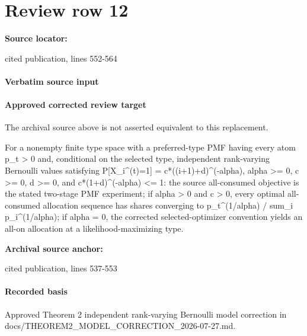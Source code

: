 \documentclass[10pt]{article}
\begin{document}
\section*{Review row 12}
\textbf{Source locator:} {\footnotesize\raggedright cited publication, lines 552-\allowbreak{}564\par}
\paragraph{Verbatim source input}
\begin{ReviewVerbatim}
\end{ReviewVerbatim}

\paragraph{Approved corrected review target}
The archival source above is not asserted equivalent to this replacement.
\begin{ReviewVerbatim}
For a nonempty finite type space with a preferred-type PMF having every atom p_t > 0 and, conditional on the selected type, independent rank-varying Bernoulli values satisfying P[X_i^(t)=1] = c*((i+1)+d)^(-alpha), alpha >= 0, c >= 0, d >= 0, and c*(1+d)^(-alpha) <= 1: the source all-consumed objective is the stated two-stage PMF experiment; if alpha > 0 and c > 0, every optimal all-consumed allocation sequence has shares converging to p_t^(1/alpha) / sum_i p_i^(1/alpha); if alpha = 0, the corrected selected-optimizer convention yields an all-on allocation at a likelihood-maximizing type.
\end{ReviewVerbatim}

\textbf{Archival source anchor:} {\footnotesize\raggedright cited publication, lines 537-\allowbreak{}553\par}
\paragraph{Recorded basis}
Approved Theorem 2 independent rank-\allowbreak{}varying Bernoulli model correction in docs/\allowbreak{}THEOREM2\_\allowbreak{}MODEL\_\allowbreak{}CORRECTION\_\allowbreak{}2026-\allowbreak{}07-\allowbreak{}27.\allowbreak{}md.\allowbreak{}
\end{document}
